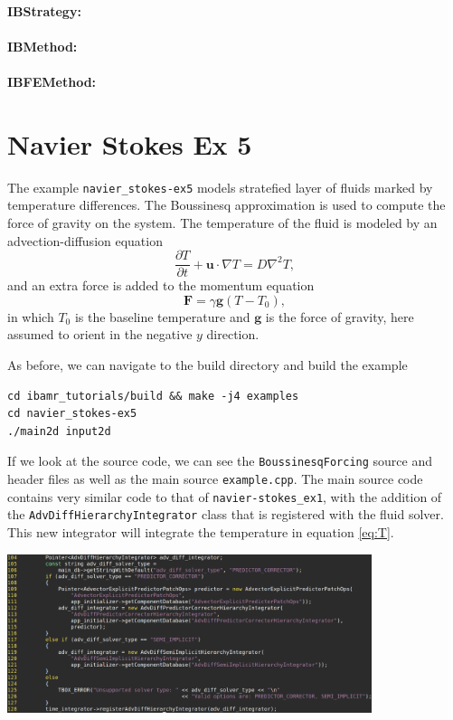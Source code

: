 \documentclass{article}
\newcommand{\bF}{\mathbf{F}}
\newcommand{\bg}{\mathbf{g}}
\newcommand{\bu}{\mathbf{u}}
\newcommand{\grad}{\nabla}
\newcommand{\Lap}{\nabla^2}
\newcommand{\parens}[1]{\mathopen{}\left(#1\right)\mathclose{}}
\begin{document}
\paragraph{IBStrategy:}

\paragraph{IBMethod:}

\paragraph{IBFEMethod:}

\section{Navier Stokes Ex 5}
The example \verb|navier_stokes-ex5| models stratefied layer of fluids marked by temperature differences. The Boussinesq approximation is used to compute the force of gravity on the system. The temperature of the fluid is modeled by an advection-diffusion equation
\begin{equation}\label{eq:T}
\frac{\partial T}{\partial t} + \bu\cdot\grad T = D\Lap T,
\end{equation}
and an extra force is added to the momentum equation
\begin{equation}\label{eq:F}
\bF = \gamma\bg\parens{T - T_0},
\end{equation}
in which $T_0$ is the baseline temperature and $\bg$ is the force of gravity, here assumed to orient in the negative $y$ direction.

As before, we can navigate to the build directory and build the example
\begin{verbatim}
cd ibamr_tutorials/build && make -j4 examples
cd navier_stokes-ex5
./main2d input2d
\end{verbatim}
If we look at the source code, we can see the \verb|BoussinesqForcing| source and header files as well as the main source \verb|example.cpp|. The main source code contains very similar code to that of \verb|navier-stokes_ex1|, with the addition of the \verb|AdvDiffHierarchyIntegrator| class that is registered with the fluid solver. This new integrator will integrate the temperature in equation \eqref{eq:T}.
\begin{center}
\includegraphics[width=0.8\textwidth]{Graphs/NS-ex5/source_AdvDiffIntegrator.png}
\end{center}
\end{document}

